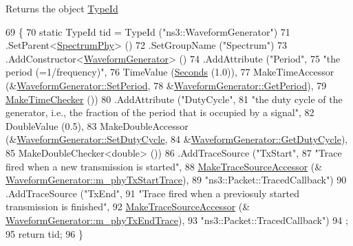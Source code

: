 \begin{DoxyReturn}{Returns}
the object \hyperlink{classns3_1_1TypeId}{Type\+Id} 
\end{DoxyReturn}

\begin{DoxyCode}
69 \{
70   \textcolor{keyword}{static} TypeId tid = TypeId (\textcolor{stringliteral}{"ns3::WaveformGenerator"})
71     .SetParent<\hyperlink{classns3_1_1SpectrumPhy_a207bd7373a9fd3b7f8d8e00380a0e7e4}{SpectrumPhy}> ()
72     .SetGroupName (\textcolor{stringliteral}{"Spectrum"})
73     .AddConstructor<\hyperlink{classns3_1_1WaveformGenerator_a7616ee9719989efceb5435b32f46e1fb}{WaveformGenerator}> ()
74     .AddAttribute (\textcolor{stringliteral}{"Period"},
75                    \textcolor{stringliteral}{"the period (=1/frequency)"},
76                    TimeValue (\hyperlink{group__timecivil_ga33c34b816f8ff6628e33d5c8e9713b9e}{Seconds} (1.0)),
77                    MakeTimeAccessor (&\hyperlink{classns3_1_1WaveformGenerator_af3dfd909dc0ba232cb44e88ea95f8675}{WaveformGenerator::SetPeriod},
78                                      &\hyperlink{classns3_1_1WaveformGenerator_a1a866556d2c82e7778f8f059681af798}{WaveformGenerator::GetPeriod}),
79                    \hyperlink{group__time_ga7032965bd4afa578691d88c09e4481c1}{MakeTimeChecker} ())
80     .AddAttribute (\textcolor{stringliteral}{"DutyCycle"},
81                    \textcolor{stringliteral}{"the duty cycle of the generator, i.e., the fraction of the period that is occupied by a
       signal"},
82                    DoubleValue (0.5),
83                    MakeDoubleAccessor (&\hyperlink{classns3_1_1WaveformGenerator_ae904df76621efd346d4bf4c825febb03}{WaveformGenerator::SetDutyCycle},
84                                        &\hyperlink{classns3_1_1WaveformGenerator_a79aa0796dbea688739d48dfabad14b35}{WaveformGenerator::GetDutyCycle}),
85                    MakeDoubleChecker<double> ())
86     .AddTraceSource (\textcolor{stringliteral}{"TxStart"},
87                      \textcolor{stringliteral}{"Trace fired when a new transmission is started"},
88                      \hyperlink{group__tracing_gab21a770b9855af4e8f69f7531ea4a6b0}{MakeTraceSourceAccessor} (&
      \hyperlink{classns3_1_1WaveformGenerator_a2a0659bb685dc46fa9cd7c6b85cf6a42}{WaveformGenerator::m\_phyTxStartTrace}),
89                      \textcolor{stringliteral}{"ns3::Packet::TracedCallback"})
90     .AddTraceSource (\textcolor{stringliteral}{"TxEnd"},
91                      \textcolor{stringliteral}{"Trace fired when a previosuly started transmission is finished"},
92                      \hyperlink{group__tracing_gab21a770b9855af4e8f69f7531ea4a6b0}{MakeTraceSourceAccessor} (&
      \hyperlink{classns3_1_1WaveformGenerator_af6111fb8eea2a3e2be3a96a5f28cb129}{WaveformGenerator::m\_phyTxEndTrace}),
93                      \textcolor{stringliteral}{"ns3::Packet::TracedCallback"})
94   ;
95   \textcolor{keywordflow}{return} tid;
96 \}
\end{DoxyCode}


